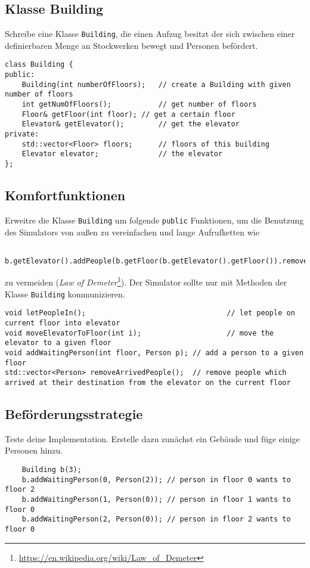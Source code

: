 \subsection{Klasse Building}
Schreibe eine Klasse \texttt{Building}, die einen Aufzug besitzt der sich zwischen einer definierbaren Menge an Stockwerken bewegt und Personen befördert.

\begin{lstlisting}
class Building {
public:
	Building(int numberOfFloors);	// create a Building with given number of floors
	int getNumOfFloors();			// get number of floors
	Floor& getFloor(int floor);	// get a certain floor
	Elevator& getElevator();		// get the elevator
private:
	std::vector<Floor> floors;		// floors of this building
	Elevator elevator;				// the elevator
};
\end{lstlisting}


\subsection{Komfortfunktionen}
Erweitre die Klasse \texttt{Building} um folgende \texttt{public} Funktionen, um die Benutzung des Simulators von außen zu vereinfachen und lange Aufrufketten wie
\begin{lstlisting}
	b.getElevator().addPeople(b.getFloor(b.getElevator().getFloor()).removeAllPeople());
\end{lstlisting}

zu vermeiden (\emph{Law of Demeter}\footnote{\url{https://en.wikipedia.org/wiki/Law_of_Demeter}}).
Der Simulator sollte nur mit Methoden der Klasse \texttt{Building} kommunizieren.

\begin{lstlisting}
void letPeopleIn();									// let people on current floor into elevator
void moveElevatorToFloor(int i);					// move the elevator to a given floor
void addWaitingPerson(int floor, Person p);	// add a person to a given floor
std::vector<Person> removeArrivedPeople();	// remove people which arrived at their destination from the elevator on the current floor
\end{lstlisting}

\subsection{Beförderungsstrategie}
Teste deine Implementation.
Erstelle dazu zunächst ein Gebäude und füge einige Personen hinzu.

\begin{lstlisting}
	Building b(3);
	b.addWaitingPerson(0, Person(2)); // person in floor 0 wants to floor 2
	b.addWaitingPerson(1, Person(0)); // person in floor 1 wants to floor 0
	b.addWaitingPerson(2, Person(0)); // person in floor 2 wants to floor 0
\end{lstlisting}

